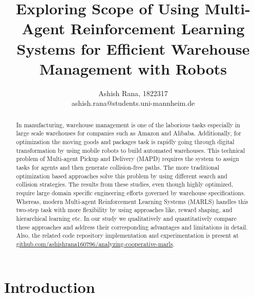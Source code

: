 \documentclass{article}
\title{Exploring Scope of Using Multi-Agent Reinforcement Learning Systems for Efficient Warehouse Management with Robots}
\author{Ashish Rana, 1822317 \\
        ashish.rana@students.uni-mannheim.de}
\begin{document}
\maketitle
\tableofcontents %
\listoftables %
\newpage


\begin{abstract}


In manufacturing, warehouse management is one of the laborious tasks especially in large scale warehouses for companies such as Amazon and Alibaba.
Additionally, for optimization the moving goods and packages task is rapidly going through digital transformation by using mobile robots to build automated warehouses.
This technical problem of Multi-agent Pickup and Delivery (MAPD) requires the system to assign tasks for agents and then generate collision-free paths.
The more traditional optimization based approaches solve this problem by using different search and collision strategies.
The results from these studies, even though highly optimized, require large domain specific engineering efforts governed by warehouse specifications.
Whereas, modern Multi-agent Reinforcement Learning Systems (MARLS) handles this two-step task with more flexibility by using approaches like, reward shaping, and hierarchical learning etc.
In our study we qualitatively and quantitatively compare these approaches and address their corresponding advantages and limitations in detail.
Also, the related code repository implementation and experimentation is present at \href{https://github.com/ashishrana160796/analyzing-cooperative-marls}{github.com/ashishrana160796/analyzing-cooperative-marls}.


\end{abstract}


\section{Introduction}
\end{document}
